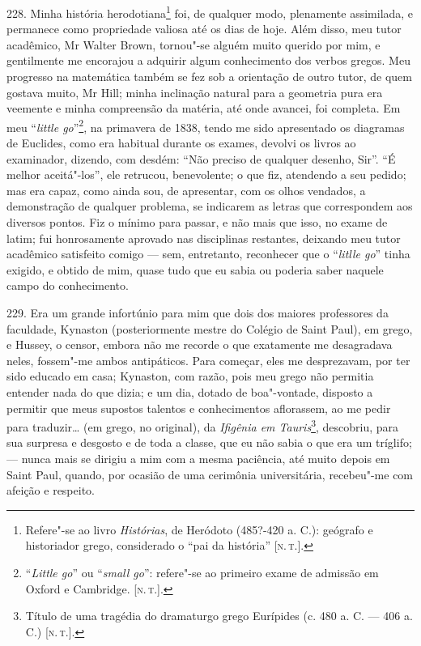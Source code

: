 228. Minha história herodotiana\footnote{Refere"-se ao livro
  \emph{Histórias}, de Heródoto (485?-420 a. C.): geógrafo e historiador
  grego, considerado o ``pai da história'' {[}\textsc{n.\,t.}{]}.} foi, de
qualquer modo, plenamente assimilada, e permanece como propriedade
valiosa até os dias de hoje. Além disso, meu tutor acadêmico, Mr Walter
Brown, tornou"-se alguém muito querido por mim, e gentilmente me
encorajou a adquirir algum conhecimento dos verbos gregos. Meu progresso
na matemática também se fez sob a orientação de outro tutor, de quem
gostava muito, Mr Hill; minha inclinação natural para a geometria pura
era veemente e minha compreensão da matéria, até onde avancei, foi
completa. Em meu ``\emph{little go}''\footnote{``\emph{Little go}'' ou
  ``\emph{small go}'': refere"-se ao primeiro exame de admissão em Oxford
  e Cambridge. {[}\textsc{n.\,t.}{]}.}, na primavera de 1838, tendo me sido
apresentado os diagramas de Euclides, como era habitual durante os
exames, devolvi os livros ao examinador, dizendo, com desdém: ``Não
preciso de qualquer desenho, Sir''. ``É melhor aceitá"-los'', ele
retrucou, benevolente; o que fiz, atendendo a seu pedido; mas era capaz,
como ainda sou, de apresentar, com os olhos vendados, a demonstração de
qualquer problema, se indicarem as letras que correspondem aos diversos
pontos. Fiz o mínimo para passar, e não mais que isso, no exame de
latim; fui honrosamente aprovado nas disciplinas restantes, deixando meu
tutor acadêmico satisfeito comigo --- sem, entretanto, reconhecer que o
``\emph{litlle go}'' tinha exigido, e obtido de mim, quase tudo que eu
sabia ou poderia saber naquele campo do conhecimento.

229. Era um grande infortúnio para mim que dois dos maiores professores
da faculdade, Kynaston (posteriormente mestre do Colégio de Saint Paul),
em grego, e Hussey, o censor, embora não me recorde o que exatamente me
desagradava neles, fossem"-me ambos antipáticos. Para começar, eles me
desprezavam, por ter sido educado em casa; Kynaston, com razão, pois meu
grego não permitia entender nada do que dizia; e um dia, dotado de
boa"-vontade, disposto a permitir que meus supostos talentos e
conhecimentos aflorassem, ao me pedir para traduzir\ldots{} (em grego, no
original), da \emph{Ifigênia em Tauris}\footnote{Título de uma tragédia
  do dramaturgo grego Eurípides (c. 480 a. C. --- 406 a. C.) {[}\textsc{n.\,t.}{]}.}, descobriu, para sua surpresa e desgosto e de toda a classe,
que eu não sabia o que era um tríglifo; --- nunca mais se dirigiu a mim
com a mesma paciência, até muito depois em Saint Paul, quando, por
ocasião de uma cerimônia universitária, recebeu"-me com afeição e
respeito.

